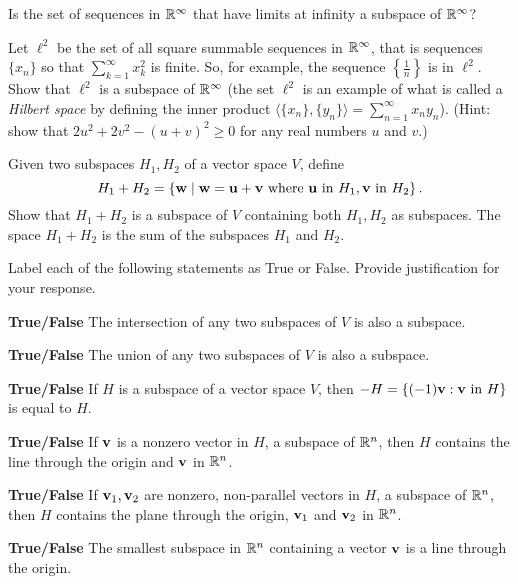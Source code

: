 	
	\item Is the set of sequences in $\mathbb{R}^{\infty}$ that have limits at infinity a subspace of $\mathbb{R}^{\infty}$? 
	

	\item Let $\ell^2$ be the set of all square summable sequences in $\mathbb{R}^{\infty}$, that is sequences $\{x_n\}$ so that $\sum_{k = 1}^{\infty} x_k^2$ is finite. So, for example, the sequence $\left\{\frac{1}{n}\right\}$ is in $\ell^2$. Show that $\ell^2$ is a subspace of $\mathbb{R}^{\infty}$ (the set $\ell^2$ is an example of what is called a \emph{Hilbert space} by defining the inner product $\langle \{x_n\}, \{y_n\} \rangle = \sum_{n = 1}^{\infty} x_ny_n$). (Hint: show that $2u^2 + 2v^2 - (u+v)^2 \geq 0$ for any real numbers $u$ and $v$.)


	\ea
	
\item \label{ex:5_a_sum} Given two subspaces $H_1, H_2$ of a vector space $V$, define 
\[ H_1+H_2 = \{ \mathbf{w} \mid \mathbf{w}=\mathbf{u}+\mathbf{v} \text{ where } \mathbf{u} \text{ in }H_1, \mathbf{v} \text{ in }H_2\} \,.\]
Show that $H_1+H_2$ is a subspace of $V$ containing both $H_1, H_2$ as subspaces. The space $H_1+H_2$ is the sum of the subspaces $H_1$ and $H_2$. 
	
\item Label each of the following statements as True or False. Provide justification for your response.
\ba
\item \textbf{True/False} The intersection of any two subspaces of $V$ is also a subspace.

\item \textbf{True/False} The union of any two subspaces of $V$ is also a subspace.

\item \textbf{True/False} If $H$ is a subspace of a vector space $V$, then $-H=\{ (-1)\mathbf{v}: \mathbf{v} \text{ in } H\}$ is equal to $H$.

\item \textbf{True/False} If $\mathbf{v}$ is a nonzero vector in $H$, a subspace of $\mathbb{R}^n$, then $H$ contains the line through the origin and $\mathbf{v}$ in $\mathbb{R}^n$.

\item \textbf{True/False} If $\mathbf{v}_1, \mathbf{v}_2$ are nonzero, non-parallel vectors in $H$, a subspace of $\mathbb{R}^n$, then $H$ contains the plane through the origin, $\mathbf{v}_1$ and $\mathbf{v}_2$ in $\mathbb{R}^n$.

\item \textbf{True/False} The smallest subspace in $\mathbb{R}^n$ containing a vector $\mathbf{v}$ is a line through the origin.

